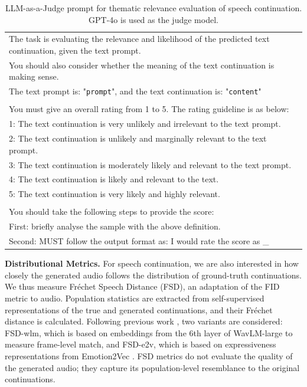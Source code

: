 \begin{table}[t]
\centering
\small
\setlength{\tabcolsep}{4.5pt}
\begin{tabular}{l}
\toprule
The task is evaluating the relevance and likelihood of the predicted text continuation, given the text prompt. \\ 
You should also consider whether the meaning of the text continuation is making sense. \\
The text prompt is: "\texttt{prompt}", and the text continuation is: "\texttt{content}" \\ \\

You must give an overall rating from 1 to 5. The rating guideline is as below: \\
1: The text continuation is very unlikely and irrelevant to the text prompt. \\
2: The text continuation is unlikely and marginally relevant to the text prompt. \\
3: The text continuation is moderately likely and relevant to the text prompt. \\
4: The text continuation is likely and relevant to the text. \\
5: The text continuation is very likely and highly relevant. \\ \\

You should take the following steps to provide the score: \\
First: briefly analyse the sample with the above definition. \\
Second: MUST follow the output format as: I would rate the score as \_ \\
\bottomrule
\end{tabular}
\caption{LLM-as-a-Judge prompt for thematic relevance evaluation of speech continuation. GPT-4o is used as the judge model.}
\label{tab:audio:llm-judge}
\end{table}

\textbf{Distributional Metrics.} For speech continuation, we are also interested in how closely the generated audio follows the distribution of ground-truth continuations. We thus measure Fr\'echet Speech Distance (FSD), an adaptation of the FID metric to audio. Population statistics are extracted from self-supervised representations of the true and generated continuations, and their Fr\'echet distance is calculated. Following previous work \citep{audio:flow-slm}, two variants are considered: FSD-wlm, which is based on embeddings from the 6th layer of WavLM-large \citep{audio:wavlm} to measure frame-level match, and FSD-e2v, which is based on expressiveness representations from Emotion2Vec \citep{audio:emotion2vec}. FSD metrics do not evaluate the quality of the generated audio; they capture its population-level resemblance to the original continuations.
 
